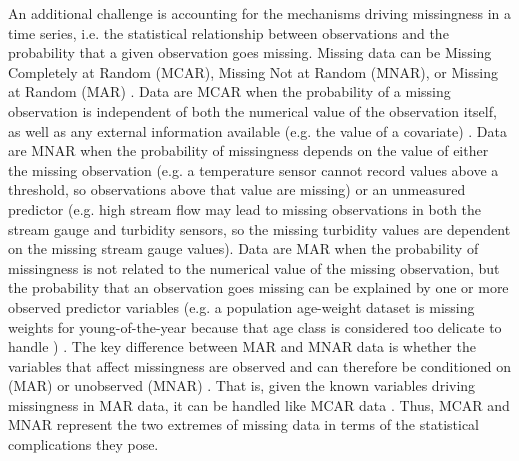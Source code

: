 \documentclass{article}
\begin{document}
An additional challenge is accounting for the mechanisms driving missingness in a time series, i.e. the statistical relationship between observations and the probability that a given observation goes missing. Missing data can be Missing Completely at Random (MCAR), Missing Not at Random (MNAR), or Missing at Random (MAR) \citep[][Fig. \ref{fig:missingtypes}]{rubin_inference_1976, nakagawa_missing_2015}. Data are MCAR when the probability of a missing observation is independent of both the numerical value of the observation itself, as well as any external information available (e.g. the value of a covariate) \citep{nakagawa_missing_2015, horton2007much, newman_missing_2014}. %
Data are MNAR when the probability of missingness depends on the value of either the missing observation (e.g. a temperature sensor cannot record values above a threshold, so observations above that value are missing) or an unmeasured predictor (e.g.  high stream flow may lead to missing observations in both the stream gauge and turbidity sensors, so the missing turbidity values are dependent on the missing stream gauge values). Data are MAR when the probability of missingness is not related to the numerical value of the missing observation, but the probability that an observation goes missing can be explained by one or more observed predictor variables (e.g. a population age-weight dataset is  missing weights for young-of-the-year because that age class is considered  too delicate to handle ) \citep{newman_missing_2014, ellington_using_2015, nakagawa_missing_2015}. The key difference between MAR and MNAR data is whether the variables that affect missingness are observed and can therefore be conditioned on (MAR) or unobserved (MNAR) \citep{nakagawa_model_2011}. That is, given the known variables driving missingness in MAR data, it can be handled like MCAR data \citep{nakagawa_missing_2015}. Thus, MCAR and MNAR represent the two extremes of missing data in terms of the statistical complications they pose. 
\end{document}
